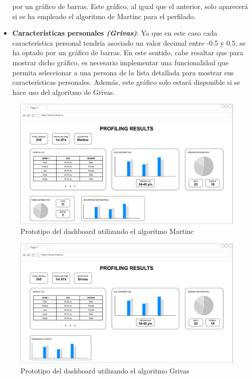 \begin{itemize}
		por un gráfico de barras. Este gráfico, al igual que el anterior, solo aparecerá si se ha empleado el algoritmo de Martinc para el perfilado.
	\item \textbf{Características personales \textit{(Grivas)}}: Ya que en este caso cada característica personal tendría asociado un valor decimal entre -0.5 y 0.5,
		se ha optado por un gráfico de barras. En este sentido, cabe resaltar que para mostrar dicho gráfico, es necesario implementar una funcionalidad que permita
		seleccionar a una persona de la lista detallada para mostrar sus características personales. Además, este gráfico solo estará disponible si se hace uso del algoritmo de Grivas.
\end{itemize}

\bigskip
\begin{figure}[H]
	\centering
	\includegraphics[width=\textwidth]{diagramas/dashboard-martinc.pdf}
	\caption{Prototipo del dashboard utilizando el algoritmo Martinc}
	\label{fig:prototipo_dashboard_martinc}
\end{figure}

\bigskip
\begin{figure}[H]
	\centering
	\includegraphics[width=\textwidth]{diagramas/dashboard-grivas.pdf}
	\caption{Prototipo del dashboard utilizando el algoritmo Grivas}
	\label{fig:prototipo_dashboard_grivas}
\end{figure}
